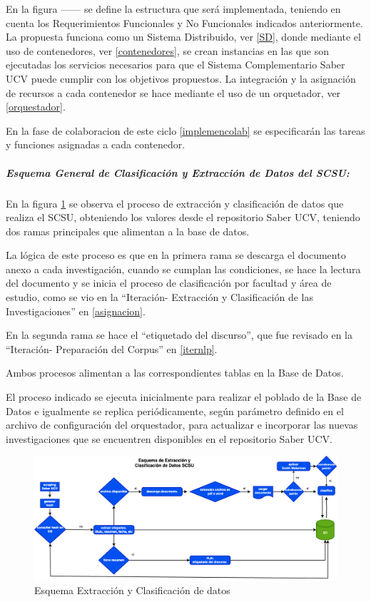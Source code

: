 \documentclass[
  12pt,
  openany]{book}
\begin{document}
En la figura ------ se define la estructura que será implementada, teniendo en cuenta los Requerimientos Funcionales y No Funcionales indicados anteriormente. La propuesta funciona como un Sistema Distribuido, ver \ref{SD}, donde mediante el uso de contenedores, ver \ref{contenedores}, se crean instancias en las que son ejecutadas los servicios necesarios para que el Sistema Complementario Saber UCV puede cumplir con los objetivos propuestos. La integración y la asignación de recursos a cada contenedor se hace mediante el uso de un orquetador, ver \ref{orquestador}.

En la fase de colaboracion de este ciclo \ref{implemencolab} se especificarán las tareas y funciones asignadas a cada contenedor.

\hypertarget{esquema-general-de-clasificaciuxf3n-y-extracciuxf3n-de-datos-del-scsu}{%
\subparagraph{Esquema General de Clasificación y Extracción de Datos del SCSU:}\label{esquema-general-de-clasificaciuxf3n-y-extracciuxf3n-de-datos-del-scsu}}

En la figura \ref{fig:diagramaextra} se observa el proceso de extracción y clasificación de datos que realiza el SCSU, obteniendo los valores desde el repositorio Saber UCV, teniendo dos ramas principales que alimentan a la base de datos.

La lógica de este proceso es que en la primera rama se descarga el documento anexo a cada investigación, cuando se cumplan las condiciones, se hace la lectura del documento y se inicia el proceso de clasificación por facultad y área de estudio, como se vio en la ``Iteración- Extracción y Clasificación de las Investigaciones'' en \ref{asignacion}.

En la segunda rama se hace el ``etiquetado del discurso'', que fue revisado en la ``Iteración- Preparación del Corpus'' en \ref{iternlp}.

Ambos procesos alimentan a las correspondientes tablas en la Base de Datos.

El proceso indicado se ejecuta inicialmente para realizar el poblado de la Base de Datos e igualmente se replica periódicamente, según parámetro definido en el archivo de configuración del orquestador, para actualizar e incorporar las nuevas investigaciones que se encuentren disponibles en el repositorio Saber UCV.

\begin{figure}

{\centering \includegraphics[width=0.9\linewidth]{images/05-desarrollo/4_ciclo/esquema extraccion} 

}

\caption{Esquema Extracción y Clasificación de datos}\label{fig:diagramaextra}
\end{figure}
\end{document}
